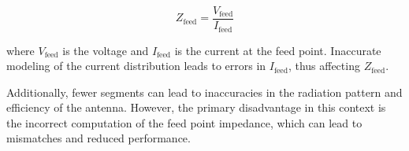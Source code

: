 \[
Z_{\text{feed}} = \frac{V_{\text{feed}}}{I_{\text{feed}}}
\]

where \( V_{\text{feed}} \) is the voltage and \( I_{\text{feed}} \) is the current at the feed point. Inaccurate modeling of the current distribution leads to errors in \( I_{\text{feed}} \), thus affecting \( Z_{\text{feed}} \).

Additionally, fewer segments can lead to inaccuracies in the radiation pattern and efficiency of the antenna. However, the primary disadvantage in this context is the incorrect computation of the feed point impedance, which can lead to mismatches and reduced performance.

